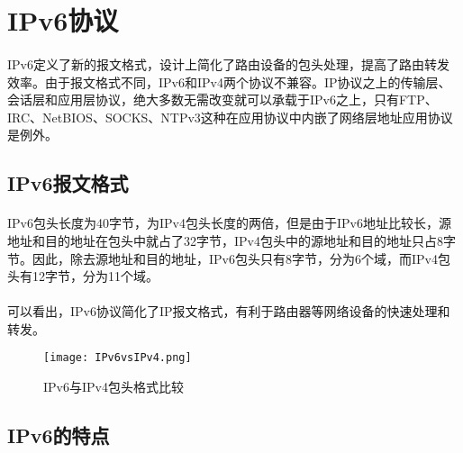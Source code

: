 \documentclass[a4paper,14pt,openany]{article}
\begin{document}
\newpage
\section{IPv6协议}
\paragraph{}
IPv6定义了新的报文格式，设计上简化了路由设备的包头处理，提高了路由转发效率。由于报文格式不同，IPv6和IPv4两个协议不兼容。IP协议之上的传输层、会话层和应用层协议，绝大多数无需改变就可以承载于IPv6之上，只有FTP、IRC、NetBIOS、SOCKS、NTPv3这种在应用协议中内嵌了网络层地址应用协议是例外。

\subsection{IPv6报文格式} %
\paragraph{}
IPv6包头长度为40字节，为IPv4包头长度的两倍，但是由于IPv6地址比较长，源地址和目的地址在包头中就占了32字节，IPv4包头中的源地址和目的地址只占8字节。因此，除去源地址和目的地址，IPv6包头只有8字节，分为6个域，而IPv4包头有12字节，分为11个域。
\paragraph{}
可以看出，IPv6协议简化了IP报文格式，有利于路由器等网络设备的快速处理和转发。
\begin{figure}[htbp]
\small
\centering
\texttt{[image: IPv6vsIPv4.png]}
\caption{IPv6与IPv4包头格式比较}
\label{fig:IPv6vsIPv4}
\end{figure}

\subsection{IPv6的特点}
\end{document}
